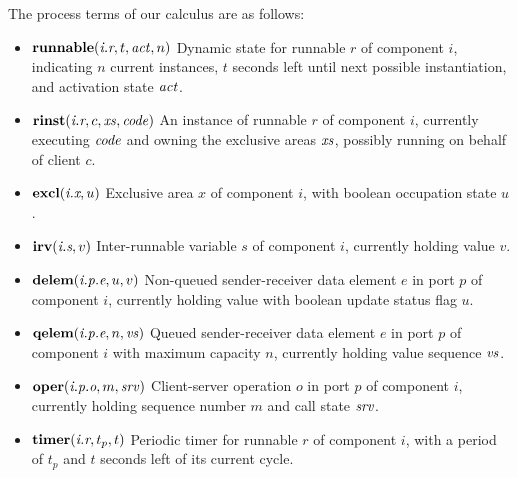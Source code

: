 \documentclass[twocolumn]{article}
\begin{document}
The process terms of our calculus are as follows:
\begin{itemize}
\item $\Trunnable {\Tr r i} t \Act n$  \newline
Dynamic state for runnable $r$ of component $i$, indicating $n$ current instances, $t$ seconds left until next possible instantiation, and activation state $\Act$.
\item $\Trinst {\Tr r i} c \Xs \Code$ \newline
An instance of runnable $r$ of component $i$, currently executing $\Code$ and owning the exclusive areas $\Xs$, possibly running on behalf of client $c$.
\item $\Texcl {\Tx x i} u$ \newline
Exclusive area $x$ of component $i$, with boolean occupation state $u$.
\item $\Tirv {\Ts s i} v$ \newline
Inter-runnable variable $s$ of component $i$, currently holding value $v$.
\item $\Tdelem {\Tep e p i} u v$ \newline
Non-queued sender-receiver data element $e$ in port $p$ of component $i$, currently holding value  with boolean update status flag $u$.
\item $\Tqelem {\Tep e p i} n \Vs$ \newline
Queued sender-receiver data element $e$ in port $p$ of component $i$ with maximum capacity $n$, currently holding value sequence $\Vs$.
\item $\Toper {\Top o p i} m \Srv$ \newline
Client-server operation $o$ in port $p$ of component $i$, currently holding sequence number $m$ and call state $\Srv$.
\item $\Ttimer {\Tr r i} {t_p} t$ \newline
Periodic timer for runnable $r$ of component $i$, with a period of $t_p$ and $t$ seconds left of its current cycle.
\end{itemize}
\end{document}
